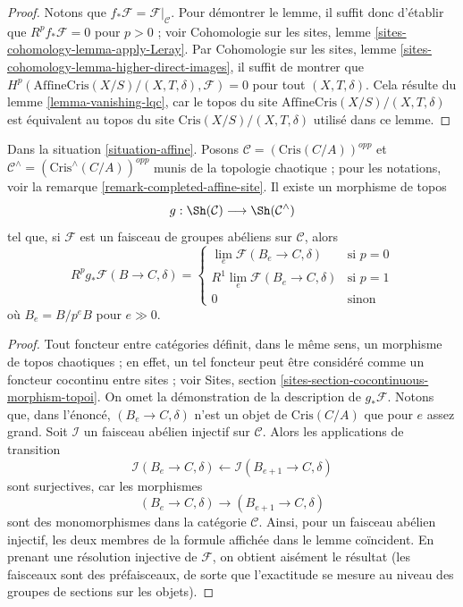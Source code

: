 \begin{proof}
\medskip\noindent
Notons que $f_*\mathcal{F} = \mathcal{F}|_\mathcal{C}$. Pour démontrer le lemme, il suffit donc
d'établir que $R^pf_*\mathcal{F} = 0$ pour $p > 0$ ; voir
Cohomologie sur les sites, lemme \ref{sites-cohomology-lemma-apply-Leray}. Par
Cohomologie sur les sites, lemme \ref{sites-cohomology-lemma-higher-direct-images},
il suffit de montrer que
$H^p(\text{AffineCris}(X/S)/(X, T, \delta), \mathcal{F}) = 0$
pour tout $(X, T, \delta)$.
Cela résulte du lemme \ref{lemma-vanishing-lqc}, car le
topos du site $\text{AffineCris}(X/S)/(X, T, \delta)$
est équivalent au topos du site
$\text{Cris}(X/S)/(X, T, \delta)$ utilisé dans ce lemme.
\end{proof}

\begin{lemma}
\label{lemma-complete}
Dans la situation \ref{situation-affine}.
Posons $\mathcal{C} = (\text{Cris}(C/A))^{opp}$ et
$\mathcal{C}^\wedge = (\text{Cris}^\wedge(C/A))^{opp}$
munis de la topologie chaotique ; pour les notations, voir la
remarque \ref{remark-completed-affine-site}.
Il existe un morphisme de topos
$$
g : \Sh(\mathcal{C}) \longrightarrow \Sh(\mathcal{C}^\wedge)
$$
tel que, si $\mathcal{F}$ est un faisceau de groupes abéliens sur
$\mathcal{C}$, alors
$$
R^pg_*\mathcal{F}(B \to C, \delta) =
\left\{
\begin{matrix}
\lim_e \mathcal{F}(B_e \to C, \delta) & \text{si }p = 0 \\
R^1\lim_e \mathcal{F}(B_e \to C, \delta) & \text{si }p = 1 \\
0 & \text{sinon}
\end{matrix}
\right.
$$
où $B_e = B/p^eB$ pour $e \gg 0$.
\end{lemma}

\begin{proof}
Tout foncteur entre catégories définit, dans le même sens, un morphisme de
topos chaotiques ; en effet, un tel foncteur
peut être considéré comme un foncteur cocontinu entre sites ; voir
Sites, section \ref{sites-section-cocontinuous-morphism-topoi}.
On omet la démonstration de la description de $g_*\mathcal{F}$.
Notons que, dans l'énoncé, $(B_e \to C, \delta)$
n'est un objet de $\text{Cris}(C/A)$ que pour $e$ assez grand.
Soit $\mathcal{I}$ un faisceau abélien injectif sur $\mathcal{C}$.
Alors les applications de transition
$$
\mathcal{I}(B_e \to C, \delta) \leftarrow
\mathcal{I}(B_{e + 1} \to C, \delta)
$$
sont surjectives, car les morphismes
$$
(B_e \to C, \delta)
\longrightarrow
(B_{e + 1} \to C, \delta)
$$
sont des monomorphismes dans la catégorie $\mathcal{C}$. Ainsi, pour un faisceau
abélien injectif, les deux membres de la formule affichée dans le lemme coïncident.
En prenant une résolution injective de $\mathcal{F}$, on obtient aisément
le résultat (les faisceaux sont des préfaisceaux, de sorte que l'exactitude se mesure au
niveau des groupes de sections sur les objets).
\end{proof}


